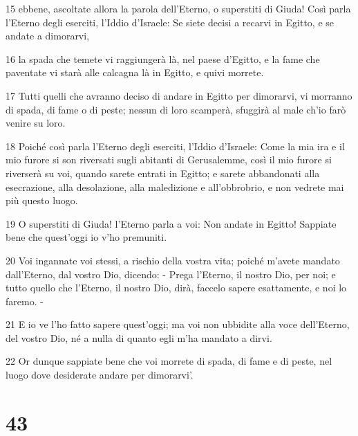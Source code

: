 \par 15 ebbene, ascoltate allora la parola dell'Eterno, o superstiti di Giuda! Così parla l'Eterno degli eserciti, l'Iddio d'Israele: Se siete decisi a recarvi in Egitto, e se andate a dimorarvi,
\par 16 la spada che temete vi raggiungerà là, nel paese d'Egitto, e la fame che paventate vi starà alle calcagna là in Egitto, e quivi morrete.
\par 17 Tutti quelli che avranno deciso di andare in Egitto per dimorarvi, vi morranno di spada, di fame o di peste; nessun di loro scamperà, sfuggirà al male ch'io farò venire su loro.
\par 18 Poiché così parla l'Eterno degli eserciti, l'Iddio d'Israele: Come la mia ira e il mio furore si son riversati sugli abitanti di Gerusalemme, così il mio furore si riverserà su voi, quando sarete entrati in Egitto; e sarete abbandonati alla esecrazione, alla desolazione, alla maledizione e all'obbrobrio, e non vedrete mai più questo luogo.
\par 19 O superstiti di Giuda! l'Eterno parla a voi: Non andate in Egitto! Sappiate bene che quest'oggi io v'ho premuniti.
\par 20 Voi ingannate voi stessi, a rischio della vostra vita; poiché m'avete mandato dall'Eterno, dal vostro Dio, dicendo: - Prega l'Eterno, il nostro Dio, per noi; e tutto quello che l'Eterno, il nostro Dio, dirà, faccelo sapere esattamente, e noi lo faremo. -
\par 21 E io ve l'ho fatto sapere quest'oggi; ma voi non ubbidite alla voce dell'Eterno, del vostro Dio, né a nulla di quanto egli m'ha mandato a dirvi.
\par 22 Or dunque sappiate bene che voi morrete di spada, di fame e di peste, nel luogo dove desiderate andare per dimorarvi'.

\chapter{43}

